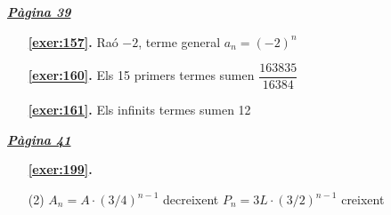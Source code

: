 
\hyperlink{page.39}{\textbf{\em Pàgina 39}}
\begin{enumerate}
\item[\fontfamily{phv}\selectfont\color{blue}\textbf{\ref{exer:157}. }] \label{ans:157} 
Raó $-2$, terme general $a_n=(-2)^n$
 \end{enumerate}
\begin{enumerate}
\item[\fontfamily{phv}\selectfont\color{blue}\textbf{\ref{exer:160}. }] \label{ans:160} 
Els 15 primers termes sumen $\dfrac {163835}{16384}$
\item[\fontfamily{phv}\selectfont\color{blue}\textbf{\ref{exer:161}. }] \label{ans:161} 
Els infinits termes sumen 12
 \end{enumerate}
\vspace{0.3cm}


\hyperlink{page.41}{\textbf{\em Pàgina 41}}
\begin{enumerate}



 \item[\fontfamily{phv}\selectfont\color{blue}\textbf{\ref{exer:199}. }] \label{ans:199}
 \begin{tasks}[column-sep=1em, item-indent=1.3333em](2)
	 \task* $A_n = A \cdot (3/4)^{n-1}$ decreixent
	 \task* $P_n = 3L \cdot (3/2)^{n-1}$ creixent
\end{tasks}
 \end{enumerate}
\vspace{0.3cm}


